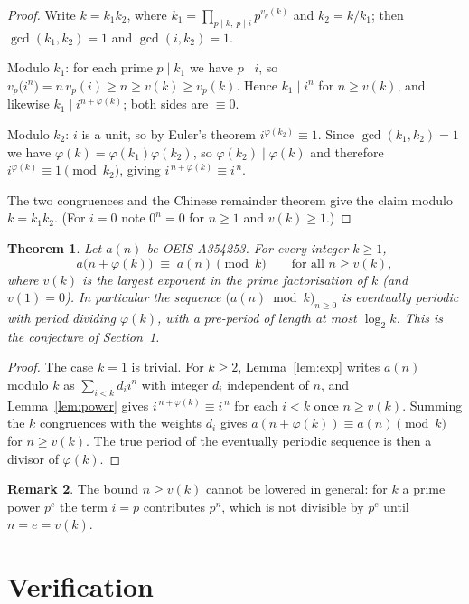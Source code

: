 \documentclass[11pt,a4paper]{article}
\theoremstyle{plain}
\newtheorem{theorem}{Theorem}
\theoremstyle{definition}
\newtheorem{remark}[theorem]{Remark}
\begin{document}
\begin{proof}
Write $k=k_1k_2$, where $k_1=\prod_{p\mid k,\ p\mid i}p^{v_p(k)}$ and $k_2=k/k_1$; then
$\gcd(k_1,k_2)=1$ and $\gcd(i,k_2)=1$.

Modulo $k_1$: for each prime $p\mid k_1$ we have $p\mid i$, so
$v_p\bigl(i^{n}\bigr)=n\,v_p(i)\ge n\ge v(k)\ge v_p(k)$. Hence $k_1\mid i^{n}$ for
$n\ge v(k)$, and likewise $k_1\mid i^{n+\varphi(k)}$; both sides are $\equiv 0$.

Modulo $k_2$: $i$ is a unit, so by Euler's theorem $i^{\varphi(k_2)}\equiv 1$. Since
$\gcd(k_1,k_2)=1$ we have $\varphi(k)=\varphi(k_1)\varphi(k_2)$, so
$\varphi(k_2)\mid\varphi(k)$ and therefore $i^{\varphi(k)}\equiv 1 \pmod{k_2}$, giving
$i^{\,n+\varphi(k)}\equiv i^{\,n}$.

The two congruences and the Chinese remainder theorem give the claim modulo $k=k_1k_2$.
(For $i=0$ note $0^{n}=0$ for $n\ge 1$ and $v(k)\ge1$.)
\end{proof}

\begin{theorem}\label{thm:main}
Let $a(n)$ be OEIS A354253. For every integer $k\ge1$,
\[
a\bigl(n+\varphi(k)\bigr)\;\equiv\;a(n)\pmod{k}\qquad\text{for all } n\ge v(k),
\]
where $v(k)$ is the largest exponent in the prime factorisation of $k$ (and $v(1)=0$).
In particular the sequence $\bigl(a(n)\bmod k\bigr)_{n\ge0}$ is eventually periodic with
period dividing $\varphi(k)$, with a pre-period of length at most $\log_2 k$. This is the
conjecture of Section~1.
\end{theorem}

\begin{proof}
The case $k=1$ is trivial. For $k\ge2$, Lemma~\ref{lem:exp} writes $a(n)$ modulo $k$ as
$\sum_{i<k}d_i i^{n}$ with integer $d_i$ independent of $n$, and Lemma~\ref{lem:power}
gives $i^{\,n+\varphi(k)}\equiv i^{\,n}$ for each $i<k$ once $n\ge v(k)$. Summing the
$k$ congruences with the weights $d_i$ gives
$a(n+\varphi(k))\equiv a(n)\pmod k$ for $n\ge v(k)$. The true period of the eventually
periodic sequence is then a divisor of $\varphi(k)$.
\end{proof}

\begin{remark}
The bound $n\ge v(k)$ cannot be lowered in general: for $k$ a prime power $p^{e}$ the
term $i=p$ contributes $p^{n}$, which is not divisible by $p^{e}$ until $n=e=v(k)$.
\end{remark}

\section{Verification}
\end{document}
